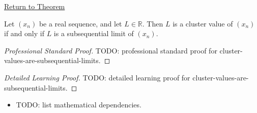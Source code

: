 \newpage
{}
\label{prf:cluster-values-are-subsequential-limits}

\begin{remark*}[Return]
\hyperref[thm:cluster-values-are-subsequential-limits]{Return to Theorem}
\end{remark*}

\begin{theorem*}
Let $(x_n)$ be a real sequence, and let $L\in\mathbb{R}$. Then $L$ is a
cluster value of $(x_n)$ if and only if $L$ is a subsequential limit of
$(x_n)$.

\smallskip
\noindent
\end{theorem*}

\begin{proof}[Professional Standard Proof]
\LRAProofBodyStart
TODO: professional standard proof for cluster-values-are-subsequential-limits.
\end{proof}

\begin{proof}[Detailed Learning Proof]
\LRAProofBodyStart
TODO: detailed learning proof for cluster-values-are-subsequential-limits.
\end{proof}

\begin{remark*}
\end{remark*}

\begin{dependencies}
\begin{itemize}
  \item TODO: list mathematical dependencies.
\end{itemize}
\end{dependencies}

\clearpage
